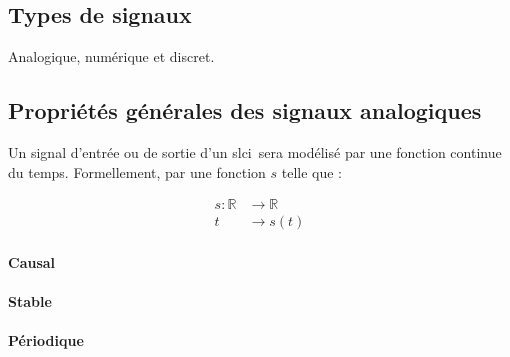 \subsection{Types de signaux}
\acpl
Analogique, numérique et discret.
\subsection{Propriétés générales des signaux analogiques}

Un signal d'entrée ou de sortie d'un \gls{slci}~sera modélisé par 
une fonction continue du temps. Formellement, par une fonction $s$ telle que :

\begin{align*}
	s : \mathbb{R}&\rightarrow\mathbb{R} \\
t&\rightarrow s(t) 
\end{align*}

\paragraph{Causal}

\begin{center}

\end{center}


\paragraph{Stable}

\begin{center}

\end{center}                

\begin{center}

\end{center}

\begin{center}

\end{center}

\paragraph{Périodique}
\begin{center}

\end{center}

